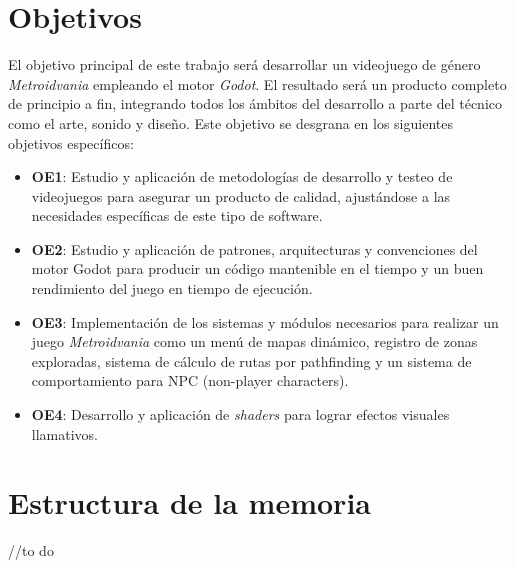 \section{Objetivos}

El objetivo principal de este trabajo será desarrollar un videojuego de género \textit{Metroidvania} empleando el motor \textit{Godot}. El resultado será un producto completo de principio a fin, integrando todos los ámbitos del desarrollo a parte del técnico como el arte, sonido y diseño. Este objetivo se desgrana en los siguientes objetivos específicos:

\begin{itemize}
    \item \textbf{OE1}: Estudio y aplicación de metodologías de desarrollo y testeo de videojuegos para asegurar un producto de calidad, ajustándose a las necesidades específicas de este tipo de software.
    \item \textbf{OE2}: Estudio y aplicación de patrones, arquitecturas y convenciones del motor Godot para producir un código mantenible en el tiempo y un buen rendimiento del juego en tiempo de ejecución.
    \item \textbf{OE3}: Implementación de los sistemas y módulos necesarios para realizar un juego \textit{Metroidvania} como un menú de mapas dinámico, registro de zonas exploradas, sistema de cálculo de rutas por pathfinding y un sistema de comportamiento para NPC (non-player characters).
    \item \textbf{OE4}: Desarrollo y aplicación de \textit{shaders} para lograr efectos visuales llamativos.

\end{itemize} 

\section{Estructura de la memoria}

//to do